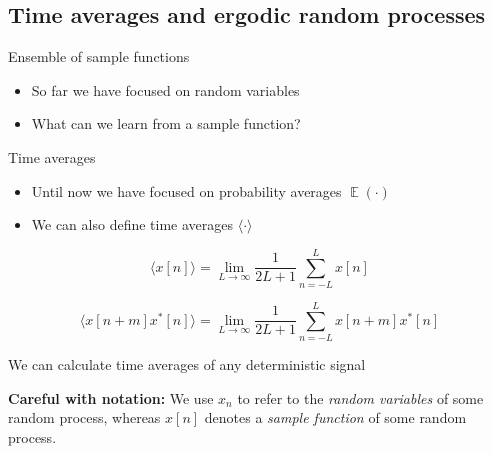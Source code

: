 \documentclass[10pt, handout]{beamer}
\DeclareMathOperator{\E}{\mathbb{E}} %
\begin{document}
\subsection{Time averages and ergodic random processes}

\begin{frame}{Ensemble of sample functions}
\begin{itemize}
	\item So far we have focused on random variables
	\item What can we learn from a sample function?
\end{itemize}
\begin{center}
	\resizebox{0.9\linewidth}{!}{}
\end{center}
\end{frame}

%
\begin{frame}{Time averages}

\begin{itemize}
	\item Until now we have focused on probability averages $\E(\cdot)$
	\item We can also define time averages $\langle\cdot\rangle$
\end{itemize}

\begin{equation*}
\langle x[n] \rangle = \lim_{L\to\infty}\frac{1}{2L + 1}\sum_{n=-L}^L x[n]
\end{equation*}

\begin{equation*}
\langle x[n+m]x^*[n] \rangle = \lim_{L\to\infty}\frac{1}{2L + 1}\sum_{n=-L}^L x[n+m]x^*[n]
\end{equation*}

We can calculate time averages of any deterministic signal

\begin{center}
	\resizebox{0.8\linewidth}{!}{}
\end{center}

\textbf{Careful with notation:} We use $x_n$ to refer to the \textit{random variables} of some random process, whereas $x[n]$ denotes a \textit{sample function} of some random process.

\end{frame}
\end{document}
